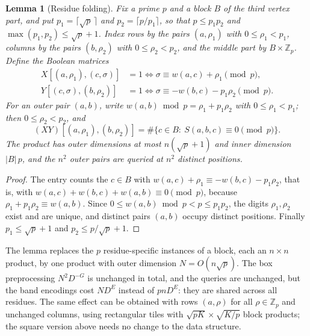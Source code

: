 \documentclass[11pt]{article}
\newtheorem{lemma}[theorem]{Lemma}
\begin{document}
\begin{lemma}[Residue folding]
\label{lem:fold}
Fix a prime $p$ and a block $B$ of the third vertex part, and put
$p_1=\lceil\sqrt p\,\rceil$ and $p_2=\lceil p/p_1\rceil$, so that
$p\le p_1p_2$ and $\max(p_1,p_2)\le\sqrt p+1$. Index rows by the pairs
$(a,\rho_1)$ with $0\le\rho_1<p_1$, columns by the pairs $(b,\rho_2)$ with
$0\le\rho_2<p_2$, and the middle part by $B\times\mathbb Z_p$. Define the
Boolean matrices
\begin{align*}
X[(a,\rho_1),(c,\sigma)]&=1\iff\sigma\equiv w(a,c)+\rho_1\pmod p,\\
Y[(c,\sigma),(b,\rho_2)]&=1\iff\sigma\equiv-w(b,c)-p_1\rho_2\pmod p.
\end{align*}
For an outer pair $(a,b)$, write $w(a,b)\bmod p=\rho_1+p_1\rho_2$ with
$0\le\rho_1<p_1$; then $0\le\rho_2<p_2$, and
\[
(XY)[(a,\rho_1),(b,\rho_2)]=\#\{c\in B:\ S(a,b,c)\equiv0\pmod p\}.
\]
The product has outer dimensions at most $n(\sqrt p+1)$ and inner dimension
$|B|\,p$, and the $n^2$ outer pairs are queried at $n^2$ distinct
positions.
\end{lemma}
\begin{proof}
The entry counts the $c\in B$ with
$w(a,c)+\rho_1\equiv-w(b,c)-p_1\rho_2$, that is, with
$w(a,c)+w(b,c)+w(a,b)\equiv0\pmod p$, because
$\rho_1+p_1\rho_2\equiv w(a,b)$. Since $0\le w(a,b)\bmod p<p\le p_1p_2$,
the digits $\rho_1,\rho_2$ exist and are unique, and distinct pairs
$(a,b)$ occupy distinct positions. Finally $p_1\le\sqrt p+1$ and
$p_2\le p/\sqrt p+1$.
\end{proof}
The lemma replaces the $p$ residue-specific instances of a block, each an
$n\times n$ product, by one product with outer dimension
$N=O(n\sqrt p)$. The box preprocessing $N^2D^{-G}$ is unchanged in total,
and the queries are unchanged, but the band encodings cost $ND^E$ instead
of $pnD^E$: they are shared across all residues. The same effect can be
obtained with rows $(a,\rho)$ for all $\rho\in\mathbb Z_p$ and unchanged
columns, using rectangular tiles with $\sqrt{pK}\times\sqrt{K/p}$ block
products; the square version above needs no change to the data structure.
\end{document}
